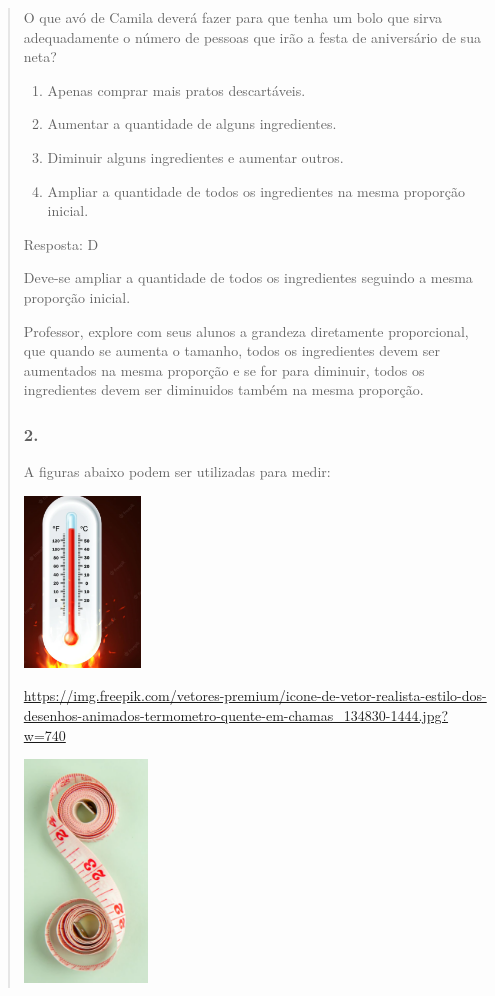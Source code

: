 \begin{enumerate}
\begin{escolha}
\begin{enumerate}
\begin{itemize}
\begin{itemize}
\begin{escolha}
\begin{quote}
\begin{escolha}
{O que avó de Camila deverá fazer para que tenha um bolo que sirva
adequadamente o número de pessoas que irão a festa de aniversário de sua
neta?

\begin{enumerate}
\def\labelenumi{\alph{enumi})}
\item
  Apenas comprar mais pratos descartáveis.
\item
  Aumentar a quantidade de alguns ingredientes.
\item
  Diminuir alguns ingredientes e aumentar outros.
\item
  Ampliar a quantidade de todos os ingredientes na mesma proporção
  inicial.
\end{enumerate}

Resposta: D

Deve-se ampliar a quantidade de todos os ingredientes seguindo a mesma
proporção inicial.

Professor, explore com seus alunos a grandeza diretamente proporcional,
que quando se aumenta o tamanho, todos os ingredientes devem ser
aumentados na mesma proporção e se for para diminuir, todos os
ingredientes devem ser diminuidos também na mesma proporção.

\subsubsection{2. }\label{section-118}

A figuras abaixo podem ser utilizadas para medir:

\includegraphics[width=1.22500in,height=1.79354in]{media/image128.png}

\url{https://img.freepik.com/vetores-premium/icone-de-vetor-realista-estilo-dos-desenhos-animados-termometro-quente-em-chamas_134830-1444.jpg?w=740}

\includegraphics[width=1.29167in,height=2.33463in]{media/image129.png}

}
\end{escolha}
\end{quote}
\end{escolha}
\end{itemize}
\end{itemize}
\end{enumerate}
\end{escolha}
\end{enumerate}

